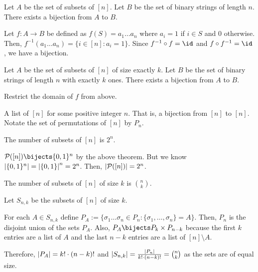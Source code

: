 \begin{theorem}
  Let $A$ be the set of subsets of $[n]$.
  Let $B$ be the set of binary strings of length $n$.
  There exists a bijection from $A$ to $B$.
\end{theorem}
\begin{prf}
  Let $f : A \to B$ be defined as $f(S) = a_1\dots a_n$
  where $a_i = 1$ if $i \in S$ and $0$ otherwise.
  Then, $f^{-1}(a_1\dots a_n) = \{i \in [n] : a_i = 1\}$.
  Since $f^{-1} \circ f = \id$ and $f \circ f^{-1} = \id$, we have a bijection.
\end{prf}

\begin{theorem}
  Let $A$ be the set of subsets of $[n]$ of size exactly $k$.
  Let $B$ be the set of binary strings of length $n$ with exactly $k$ ones.
  There exists a bijection from $A$ to $B$.
\end{theorem}
\begin{prf}
  Restrict the domain of $f$ from above.
\end{prf}

\begin{defn}[permutation]
  A list of $[n]$ for some positive integer $n$.
  That is, a bijection from $[n]$ to $[n]$.
  Notate the set of permutations of $[n]$ by $P_n$.
\end{defn}

\begin{theorem}[1.3]
  The number of subsets of $[n]$ is $2^n$.
\end{theorem}
\begin{prf}
  $\mathcal{P}([n]) \bijects \{0,1\}^n$ by the above theorem.
  But we know $\abs{\{0,1\}^n} = \abs{\{0,1\}}^n = 2^n$.
  Then, $\abs{\mathcal{P}([n])} = 2^n$.
\end{prf}

\begin{theorem}[1.5]
  The number of subsets of $[n]$ of size $k$ is $\binom{n}{k}$.
\end{theorem}
\begin{prf}
  Let $S_{n,k}$ be the subsets of $[n]$ of size $k$.

  For each $A \in S_{n,k}$ define $P_A := \{\sigma_1\dots\sigma_n \in P_n : \{\sigma_1,\dotsc,\sigma_n\} = A\}$.
  Then, $P_n$ is the disjoint union of the sets $P_A$.
  Also, $P_A \bijects P_k \times P_{n-k}$ because the first $k$ entries are a list of $A$
  and the last $n-k$ entries are a list of $[n] \setminus A$.

  Therefore, $\abs{P_A} = k! \cdot (n-k)!$ and
  $\abs{S_{n,k}} = \frac{\abs{P_n}}{k!\cdot(n-k)!} = \binom{n}{k}$
  as the sets are of equal size.
\end{prf}

